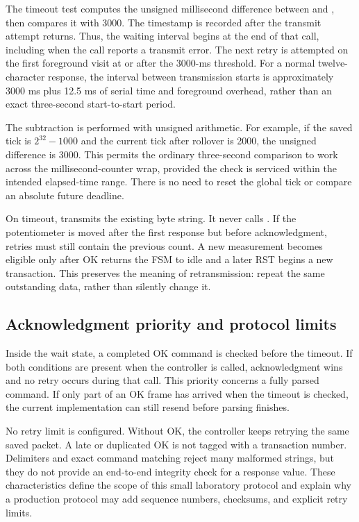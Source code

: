 \documentclass[a4paper]{article}
\newcommand{\code}[1]{\texttt{\detokenize{#1}}}
\newcommand{\topic}[1]{\subsection{#1}}
\begin{document}
The timeout test computes the unsigned millisecond difference between
\code{HAL_GetTick()} and \code{last_tx_ms}, then compares it with 3000.
The timestamp is recorded after the transmit attempt returns. Thus, the waiting
interval begins at the end of that call, including when the call reports a
transmit error. The next retry is attempted on the first foreground visit at
or after the 3000-ms threshold. For a normal twelve-character response, the
interval between transmission starts is approximately 3000 ms plus 12.5 ms
of serial time and foreground overhead, rather than an exact three-second
start-to-start period.

The subtraction is performed with unsigned arithmetic. For example, if the
saved tick is \(2^{32}-1000\) and the current tick after rollover is 2000,
the unsigned difference is 3000. This permits the ordinary three-second
comparison to work across the millisecond-counter wrap, provided the check
is serviced within the intended elapsed-time range. There is no need to reset
the global tick or compare an absolute future deadline.

On timeout, \code{SendSavedPacket} transmits the existing byte string. It never
calls \code{Sensor_ReadOnce}. If the potentiometer is moved after the first
response but before acknowledgment, retries must still contain the previous
count. A new measurement becomes eligible only after OK returns the FSM to
idle and a later RST begins a new transaction. This preserves the meaning of
retransmission: repeat the same outstanding data, rather than silently change it.


\topic{Acknowledgment priority and protocol limits}

Inside the wait state, a completed OK command is checked before the timeout.
If both conditions are present when the controller is called, acknowledgment
wins and no retry occurs during that call. This priority concerns a fully
parsed command. If only part of an OK frame has arrived when the timeout is
checked, the current implementation can still resend before parsing finishes.

No retry limit is configured. Without OK, the controller keeps retrying the
same saved packet. A late or duplicated OK is not tagged with a transaction
number. Delimiters and exact command matching reject many malformed strings,
but they do not provide an end-to-end integrity check for a response value.
These characteristics define the scope of this small laboratory protocol and
explain why a production protocol may add sequence numbers, checksums, and
explicit retry limits.
\end{document}
